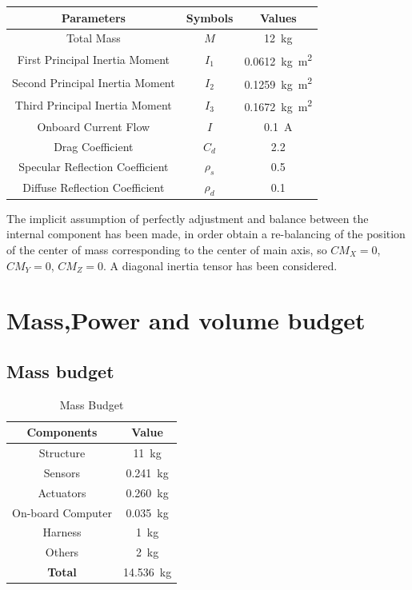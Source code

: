 \documentclass[11pt,a4paper]{report}
\begin{document}
\begin{table}[H]
	\centering
	\begin{tabular}{|c|c|c|}
		\hline
		Parameters & Symbols & Values \\
		\hline
		Total Mass & $M$ & \SI{12}{\kilo\gram}\\
        \hline
		First Principal Inertia Moment & $I_1$ & \SI{0.0612}{\kilo\gram\meter^2}\\
		\hline		
		Second Principal Inertia Moment & $I_2$ & \SI{0.1259}{\kilo\gram\meter^2}\\
		\hline
		Third Principal Inertia Moment & $I_3$ & \SI{0.1672}{\kilo\gram\meter^2}\\
		\hline
		Onboard Current Flow & $I$ & \SI{0.1}{\ampere}\\
		\hline
		Drag Coefficient & $C_d$ & 2.2 \\
		\hline
		Specular Reflection Coefficient & $\rho_{s}$ & 0.5 \\
		\hline
		Diffuse Reflection Coefficient & $\rho_{d}$ & 0.1 \\
		\hline
	\end{tabular}
\end{table}

The implicit assumption of perfectly adjustment and balance between the internal component has been made, in order obtain a re-balancing of the position of the center of mass corresponding to the center of main axis, so $CM_{X} = 0$, $CM_{Y} = 0$, $CM_{Z} = 0$.
A diagonal inertia tensor has been considered.

\section{Mass,Power and volume budget}

\subsection{Mass budget}

\begin{table}[H]
	\centering
	\begin{tabular}{|c|c|}
		\hline
		Components & Value \\
		\hline
		Structure & \SI{11}{\kilo\gram} \\
		\hline
	  	Sensors & \SI{0.241}{\kilo\gram}\\
		\hline
		Actuators & \SI{0.260}{\kilo\gram}\\
		\hline
		On-board Computer & \SI{0.035}{\kilo\gram}\\
		\hline
		Harness &  \SI{1}{\kilo\gram}\\
		\hline
        Others &  \SI{2}{\kilo\gram}\\
		\hline
		\textbf{Total} & \SI{14.536}{\kilo\gram}\\
		\hline 
	\end{tabular}
	\caption{Mass Budget}
\end{table}
\end{document}
